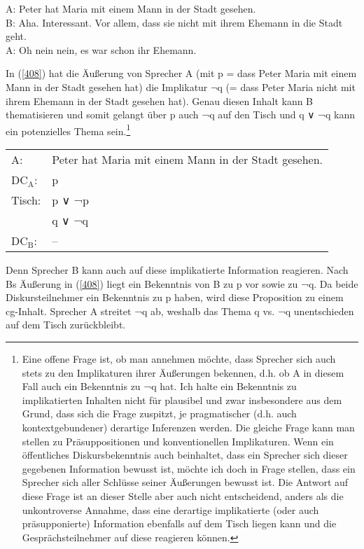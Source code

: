 \begin{exe}
	\ex\label{408} 
	A: Peter hat Maria mit einem Mann in der Stadt gesehen.\\
	B: Aha. Interessant. Vor allem, dass sie nicht mit ihrem Ehemann in die Stadt geht.\\
	A: Oh nein nein, es war schon ihr Ehemann.
\end{exe}
In (\ref{408}) hat die Äußerung von Sprecher A (mit p = dass Peter Maria mit einem Mann in der Stadt gesehen hat) die Implikatur $\neg$q (= dass Peter Maria nicht mit ihrem Ehemann in der Stadt gesehen hat). Genau diesen Inhalt kann B thematisieren und somit gelangt über p auch ¬q auf den Tisch und q ∨ ¬q kann ein potenzielles Thema sein.\footnote{\label{Fn16}Eine offene Frage ist, ob man annehmen möchte, dass Sprecher sich auch stets zu den Implikaturen ihrer Äußerungen bekennen, d.h. ob A in diesem Fall auch ein Bekenntnis zu ¬q hat. Ich halte ein Bekenntnis zu implikatierten Inhalten nicht für plausibel und zwar insbesondere aus dem Grund, dass sich die Frage zuspitzt, je pragmatischer (d.h. auch kontextgebundener) derartige Inferenzen werden. Die gleiche Frage kann man stellen zu Präsuppositionen und konventionellen Implikaturen. Wenn ein öffentliches Diskursbekenntnis auch beinhaltet, dass ein Sprecher sich dieser gegebenen Information bewusst ist, möchte ich doch in Frage stellen, dass ein Sprecher sich aller Schlüsse seiner Äußerungen bewusst ist. Die Antwort auf diese Frage ist an dieser Stelle aber auch nicht entscheidend, anders als die unkontroverse Annahme, dass eine derartige implikatierte (oder auch präsupponierte) Information ebenfalls auf dem Tisch liegen kann und die Gesprächsteilnehmer auf diese reagieren können.}
	
\begin{exe}
	\ex\label{409}
     \begin{tabular}[t]{@{}l@{ }l@{}}
     		A: & Peter hat Maria mit einem Mann in der Stadt gesehen.\\
            DC$_{\textrm{A}}$: & p\\
            Tisch: & p ∨ ¬p\\
 			 & q ∨ ¬q\\
 			DC$_{\textrm{B}}$: & --
      \end{tabular}
\end{exe}	
Denn Sprecher B kann auch auf diese implikatierte  Information reagieren. Nach Bs Äußerung in (\ref{408}) liegt ein Bekenntnis von B zu p vor sowie zu ¬q. Da beide Diskursteilnehmer ein Bekenntnis zu p haben, wird diese Proposition zu einem cg-Inhalt. Sprecher A streitet ¬q ab, weshalb das Thema q vs. ¬q unentschieden auf dem Tisch zurückbleibt. 

